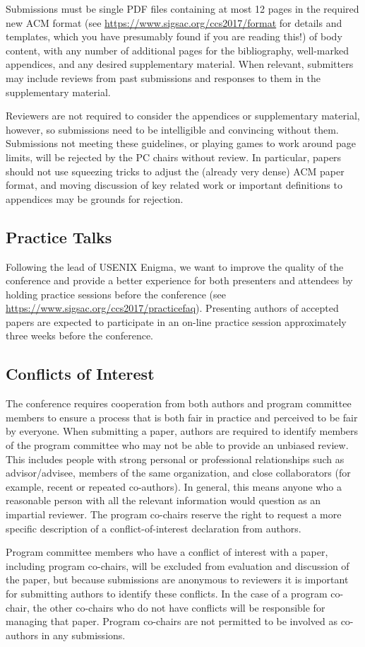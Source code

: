 Submissions must be single PDF files containing at most 12 pages in
the required new ACM format (see
\url{https://www.sigsac.org/ccs2017/format} for details and templates,
which you have presumably found if you are reading this!) of body
content, with any number of additional pages for the bibliography,
well-marked appendices, and any desired supplementary material.  When
relevant, submitters may include reviews from past submissions and
responses to them in the supplementary material.

Reviewers are not required to consider the appendices or supplementary
material, however, so submissions need to be intelligible and
convincing without them.  Submissions not meeting these guidelines, or
playing games to work around page limits, will be rejected by the PC
chairs without review.  In particular, papers should not use squeezing
tricks to adjust the (already very dense) ACM paper format, and moving
discussion of key related work or important definitions to appendices
may be grounds for rejection.

\subsection{Practice Talks}

Following the lead of USENIX Enigma, we want to improve the quality of
the conference and provide a better experience for both presenters and
attendees by holding practice sessions before the conference (see
\url{https://www.sigsac.org/ccs2017/practicefaq}). Presenting authors
of accepted papers are expected to participate in an on-line practice
session approximately three weeks before the conference.

\subsection{Conflicts of Interest}

The conference requires cooperation from both authors and program
committee members to ensure a process that is both fair in practice
and perceived to be fair by everyone. When submitting a paper, authors
are required to identify members of the program committee who may not
be able to provide an unbiased review.  This includes people with
strong personal or professional relationships such as advisor/advisee,
members of the same organization, and close collaborators (for
example, recent or repeated co-authors). In general, this means anyone
who a reasonable person with all the relevant information would
question as an impartial reviewer. The program co-chairs reserve the
right to request a more specific description of a conflict-of-interest
declaration from authors.

Program committee members who have a conflict of interest with a
paper, including program co-chairs, will be excluded from evaluation
and discussion of the paper, but because submissions are anonymous to
reviewers it is important for submitting authors to identify these
conflicts. In the case of a program co-chair, the other co-chairs who
do not have conflicts will be responsible for managing that paper.
Program co-chairs are not permitted to be involved as co-authors in
any submissions.



